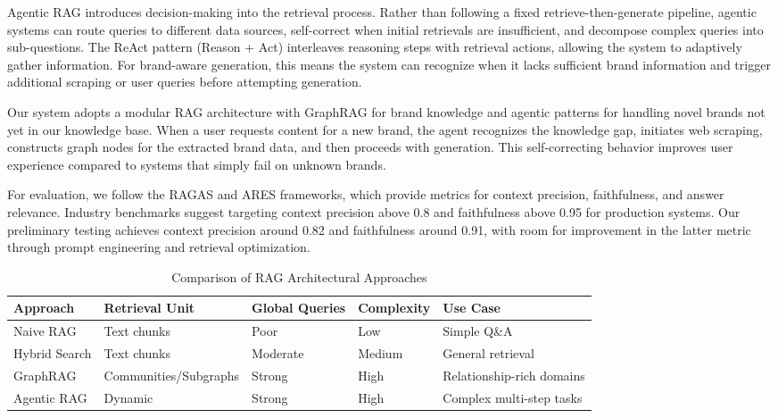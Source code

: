 \documentclass[11pt, twocolumn]{article}
\begin{document}
Agentic RAG introduces decision-making into the retrieval process. Rather than following a fixed retrieve-then-generate pipeline, agentic systems can route queries to different data sources, self-correct when initial retrievals are insufficient, and decompose complex queries into sub-questions. The ReAct pattern (Reason + Act) interleaves reasoning steps with retrieval actions, allowing the system to adaptively gather information. For brand-aware generation, this means the system can recognize when it lacks sufficient brand information and trigger additional scraping or user queries before attempting generation.

Our system adopts a modular RAG architecture with GraphRAG for brand knowledge and agentic patterns for handling novel brands not yet in our knowledge base. When a user requests content for a new brand, the agent recognizes the knowledge gap, initiates web scraping, constructs graph nodes for the extracted brand data, and then proceeds with generation. This self-correcting behavior improves user experience compared to systems that simply fail on unknown brands.

For evaluation, we follow the RAGAS and ARES frameworks, which provide metrics for context precision, faithfulness, and answer relevance. Industry benchmarks suggest targeting context precision above 0.8 and faithfulness above 0.95 for production systems. Our preliminary testing achieves context precision around 0.82 and faithfulness around 0.91, with room for improvement in the latter metric through prompt engineering and retrieval optimization.

\begin{table}[t]
\centering
\caption{Comparison of RAG Architectural Approaches}
\label{tab:rag-comparison}
\begin{tabular}{@{}lllll@{}}
\toprule
\textbf{Approach} & \textbf{Retrieval Unit} & \textbf{Global Queries} & \textbf{Complexity} & \textbf{Use Case} \\
\midrule
Naive RAG & Text chunks & Poor & Low & Simple Q\&A \\
Hybrid Search & Text chunks & Moderate & Medium & General retrieval \\
GraphRAG & Communities/Subgraphs & Strong & High & Relationship-rich domains \\
Agentic RAG & Dynamic & Strong & High & Complex multi-step tasks \\
\bottomrule
\end{tabular}
\end{table}
\end{document}
